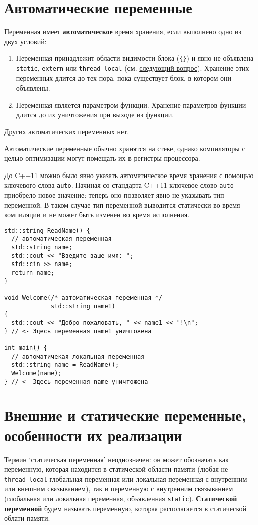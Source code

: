 \section{Автоматические переменные}
Переменная имеет \textbf{автоматическое} время хранения, если выполнено одно из двух условий:
\label{def:auto_storage}
\begin{enumerate}
  \item Переменная принадлежит области видимости блока (\verb|{}|) и явно не объявлена \verb|static|, \verb|extern| или \verb|thread_local|
  (см. \hyperref[sec:ext_stat]{следующий вопрос}).
  Хранение этих переменных длится до тех пора, пока существует блок, в котором они объявлены.
  \item Переменная является параметром функции. Хранение параметров функции длится до их уничтожения при выходе из функции.
\end{enumerate}
Других автоматических переменных нет.

Автоматические переменные обычно хранятся на стеке, однако компиляторы с целью
оптимизации могут помещать их в регистры процессора.

До C++11 можно было явно указать автоматическое время хранения с помощью
ключевого слова \verb|auto|. Начиная со стандарта C++11 ключевое слово
\verb|auto| приобрело новое значение: теперь оно позволяет явно не указывать
тип переменной. В таком случае тип переменной выводится статически во время
компиляции и не может быть изменен во время исполнения.
\begin{verbatim}
std::string ReadName() {
  // автоматическая переменная
  std::string name;
  std::cout << "Введите ваше имя: ";
  std::cin >> name;
  return name;
}

void Welcome(/* автоматическая переменная */
             std::string name1)
{
  std::cout << "Добро пожаловать, " << name1 << "!\n";
} // <- Здесь переменная name1 уничтожена

int main() {
  // автоматичекая локальная переменная
  std::string name = ReadName();
  Welcome(name);
} // <- Здесь переменная name уничтожена
\end{verbatim}

\section{Внешние и статические переменные, особенности их реализации}
\label{sec:ext_stat}
Термин `статическая переменная' неоднозначен: он может обозначать как переменную,
которая находится в статической области памяти (любая не-\verb|thread_local| глобальная
переменная или локальная переменная с внутренним или внешним связыванием),
так и переменную с внутренним связыванием (глобальная или локальная переменная, объявленная
\verb|static|). \textbf{Статической переменной} будем называть переменную, которая располагается
в статической облати памяти.


